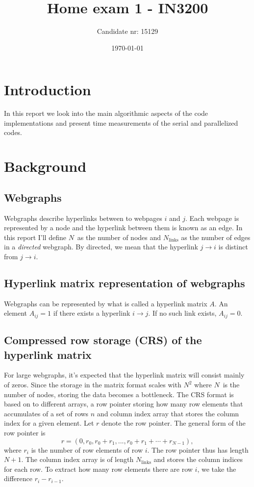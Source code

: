 \documentclass[english,notitlepage, reprint]{revtex4-1}  %
\begin{document}
\title{Home exam 1 - IN3200}      %
\author{Candidate nr: 15129}          %
\date{\today}                             %
\noaffiliation                            %
                               
\maketitle 
\section{Introduction}
In this report we look into the main algorithmic aspects of the code implementations and present time measurements of the serial and parallelized codes.
\section{Background}

\subsection*{Webgraphs}
Webgraphs describe hyperlinks between to webpages $i$ and $j$. Each webpage is represented by a node and the hyperlink between them is known as an edge. In this report I'll define $N$ as the number of nodes and $N_\text{links}$ as the number of edges in a \textit{directed }webgraph. By directed, we mean that the hyperlink $j\to i$ is distinct from $j\to i$.

\subsection*{Hyperlink matrix representation of webgraphs}
Webgraphs can be represented by what is called a hyperlink matrix $A$. An element $A_{ij} = 1$ if there exists a hyperlink $i \to j$. If no such link exists, $A_{ij} = 0$.

\subsection*{Compressed row storage (CRS) of the hyperlink matrix}
For large webgraphs, it's expected that the hyperlink matrix will consist mainly of zeros. Since the storage in the matrix format scales with $N^2$ where $N$ is the number of nodes, storing the data becomes a bottleneck. The CRS format is based on to different arrays, a row pointer storing how many row elements that accumulates of a set of rows $n$ and column index array that stores the column index for a given element. Let $r$ denote the row pointer. The general form of the row pointer is 
\begin{equation}\label{eq:row_pointer}
	r = (0, r_0, r_0 + r_1,..., r_0 + r_1 + \cdots + r_{N-1}),
\end{equation} 
where $r_i$ is the number of row elements of row $i$. The row pointer thus has length $N+1$. The column index array is of length $N_\text{links}$ and stores the column indices for each row. To extract how many row elements there are row $i$, we take the difference $r_{i}-r_{i-1}$.
\end{document}
